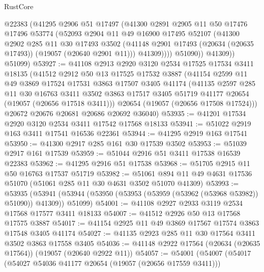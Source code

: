 \begin{lexlean}{RustCore}
\begin{coremodule}
              @22383
              (@41295
                @2906
                @51
                @17497
                (@41300
                  @2891
                  @2905
                  @11
                  @50
                  @17476
                  @17496
                  @53774
                  (@52093
                    @2904
                    @11
                    @49
                    @16900
                    @17495
                    @52107
                    (@41300
                      @2902
                      @285
                      @11
                      @30
                      @17493
                      @3502
                      (@41148 @2901 @17493 (@20634 (@20635 @17493)) (@19057 (@20640 @2901 @11)))
                      @41309))))
              @51090))
          @41309))
      @51099)
@53927 := @41108
    @2913
    @2920
    @3120
    @2534
    @17525
    @17534
    @3411
    @18135
    (@41512
      @2912
      @50
      @13
      @17525
      @17532
      @3887
      (@41154
        @2599
        @11
        @49
        @3869
        @17524
        @17531
        @3863
        @17507
        @3405
        @41174
        (@41135
          @2597
          @285
          @11
          @30
          @16763
          @3411
          @3502
          @3863
          @17517
          @3405
          @51719
          @41177
          @20654
          (@19057 (@20656 @17518 @3411)))
        @20654
        (@19057 (@20656 @17508 @17524)))
      @20672
      @20676
      @20681
      @20686
      @20692
      @36040)
@53935 := @41201 @17534 @2920 @3120 @2534 @3411 @17542 @17568 @18133
@53941 := @51022 @2919 @163 @3411 @17541 @16536 @22361
@53944 := @41295 @2919 @163 @17541
@53950 := @41300 @2917 @285 @161 @30 @17539 @3502
@53953 := @51039 @2917 @161 @17539
@53959 := @51044 @2916 @51 @3411 @17538 @16539 @22383
@53962 := @41295 @2916 @51 @17538
@53968 := @51705 @2915 @11 @50 @16763 @17537 @51719
@53982 := @51061 @894 @11 @49 @4631 @17536 @51070 (@51061 @285 @11 @30 @4631 @3502 @51070 @41309)
@53993 := @53935
    (@53941 (@53944 (@53950 (@53953 (@53959 (@53962 (@53968 @53982)) @51090)) @41309)) @51099)
@54001 := @41108 @2927 @2933 @3119 @2534 @17568 @17577 @3411 @18133
@54007 := @41512 @2926 @50 @13 @17568 @17575 @3887
@54017 := @41154 @2925 @11 @49 @3869 @17567 @17574 @3863 @17548 @3405 @41174
@54027 := @41135 @2923 @285 @11 @30 @17564 @3411 @3502 @3863 @17558 @3405
@54036 := @41148 @2922 @17564 (@20634 (@20635 @17564)) (@19057 (@20640 @2922 @11))
@54057 := @54001
    (@54007
      (@54017
        (@54027 @54036 @41177 @20654 (@19057 (@20656 @17559 @3411)))

\end{coremodule}
\end{lexlean}
